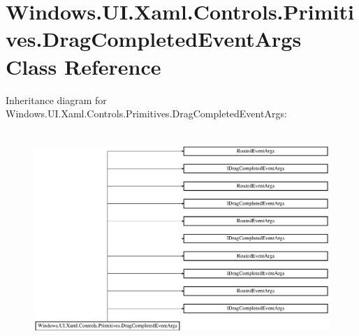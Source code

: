 \hypertarget{class_windows_1_1_u_i_1_1_xaml_1_1_controls_1_1_primitives_1_1_drag_completed_event_args}{}\section{Windows.\+U\+I.\+Xaml.\+Controls.\+Primitives.\+Drag\+Completed\+Event\+Args Class Reference}
\label{class_windows_1_1_u_i_1_1_xaml_1_1_controls_1_1_primitives_1_1_drag_completed_event_args}
Inheritance diagram for Windows.\+U\+I.\+Xaml.\+Controls.\+Primitives.\+Drag\+Completed\+Event\+Args\+:\begin{figure}[H]
\begin{center}
\leavevmode
\includegraphics[height=8.191490cm]{class_windows_1_1_u_i_1_1_xaml_1_1_controls_1_1_primitives_1_1_drag_completed_event_args}
\end{center}
\end{figure}
